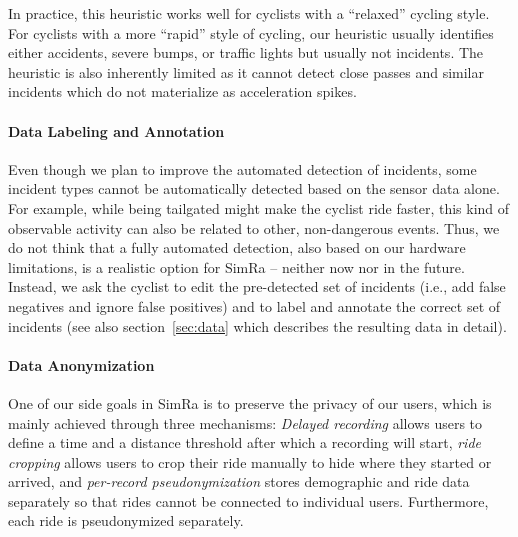 In practice, this heuristic works well for cyclists with a ``relaxed'' cycling style.
For cyclists with a more ``rapid'' style of cycling, our heuristic usually identifies either accidents, severe bumps, or traffic lights but usually not incidents.
The heuristic is also inherently limited as it cannot detect close passes and similar incidents which do not materialize as acceleration spikes.

\paragraph{Data Labeling and Annotation}

Even though we plan to improve the automated detection of incidents, some incident types cannot be automatically detected based on the sensor data alone.
For example, while being tailgated might make the cyclist ride faster, this kind of observable activity can also be related to other, non-dangerous events.
Thus, we do not think that a fully automated detection, also based on our hardware limitations, is a realistic option for SimRa -- neither now nor in the future.
Instead, we ask the cyclist to edit the pre-detected set of incidents (i.e., add false negatives and ignore false positives) and to label and annotate the correct set of incidents (see also section~\ref{sec:data} which describes the resulting data in detail).

\paragraph{Data Anonymization}

One of our side goals in SimRa is to preserve the privacy of our users, which is mainly achieved through three mechanisms: \emph{Delayed recording} allows users to define a time and a distance threshold after which a recording will start, \emph{ride cropping} allows users to crop their ride manually to hide where they started or arrived, and \emph{per-record pseudonymization} stores demographic and ride data separately so that rides cannot be connected to individual users. Furthermore, each ride is pseudonymized separately.




